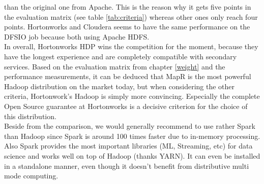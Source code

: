 than the original one from Apache. This is the reason why it gets five points in the evaluation matrix (see table \ref{tab:criteria}) whereas other ones only reach four points. Hortonworks and Cloudera seems to have the same performance on the DFSIO job because both using Apache HDFS.\\In overall, Hortonworks HDP wins the competition for the moment, because they have the longest experience and are completely compatible with secondary services. Based on the evaluation matrix from chapter \ref{weight} and the performance measurements, it can be deduced that MapR is the most powerful Hadoop distribution on the market today, but when considering the other criteria, Hortonwork's Hadoop is simply more convincing. Especially the complete Open Source guarantee at Hortonworks is a decisive criterion for the choice of this distribution.\\Beside from the comparison, we would generally recommend to use rather Spark than Hadoop since Spark is around 100 times faster due to in-memory processing. Also Spark provides the most important libraries (ML, Streaming, etc) for data science and works well on top of Hadoop (thanks YARN). It can even be installed in a standalone manner, even though it doesn’t benefit from distributive multi mode computing.
